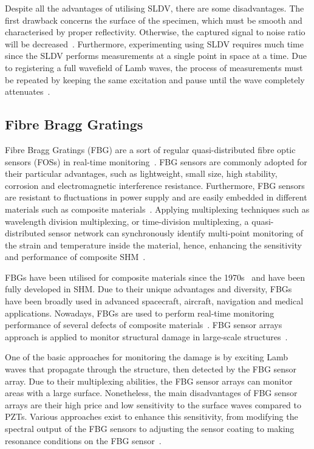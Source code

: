 Despite all the advantages of utilising SLDV, there are some disadvantages. 
The first drawback concerns the surface of the specimen, which must be smooth and characterised by proper reflectivity. Otherwise, the captured signal to noise ratio will be decreased~\cite{Ostachowicz2014}. 
Furthermore, experimenting using  SLDV requires much time since the SLDV performs measurements at a single point in space at a time.
Due to registering a full wavefield of Lamb waves, the process of measurements must be repeated by keeping the same excitation and pause until the wave completely attenuates~\cite{Ostachowicz2014}.
\subsection{Fibre Bragg Gratings} 
Fibre Bragg Gratings (FBG) are a sort of regular quasi-distributed fibre optic sensors (FOSs) in real-time monitoring~\cite{Cai2012}.  
FBG sensors are commonly adopted for their particular advantages, such as lightweight, small size, high stability, corrosion and electromagnetic interference resistance. 
Furthermore, FBG sensors are resistant to fluctuations in power supply and are easily embedded in different materials such as composite materials~\cite{Jang2012}. 
Applying multiplexing techniques such as wavelength division multiplexing, or time-division multiplexing, a quasi-distributed sensor network can synchronously identify multi-point monitoring of the strain and temperature inside the material, hence, enhancing the sensitivity and performance of composite SHM~\cite{Jang2012}.

FBGs have been utilised for composite materials since the 1970s~\cite{othonos1999fiber} and have been fully developed in SHM. 
Due to their unique advantages and diversity, FBGs have been broadly used in advanced spacecraft, aircraft, navigation and medical applications. 
Nowadays, FBGs are used to perform real-time monitoring performance of several defects of composite materials~\cite{rezayat2016reconstruction}.
FBG sensor arrays approach is applied to monitor structural damage in large-scale structures~\cite{Wee2017}.

One of the basic approaches for monitoring the damage is by exciting Lamb waves that propagate through the structure, then detected by the FBG sensor array. 
Due to their multiplexing abilities, the FBG sensor arrays can monitor areas with a large surface. 
Nonetheless, the main disadvantages of FBG sensor arrays are their high price and low sensitivity to the surface waves compared to PZTs. 
Various approaches exist to enhance this sensitivity, from modifying the spectral output of the FBG sensors to adjusting the sensor coating to making resonance conditions on the FBG sensor~\cite{Wee2017}.

